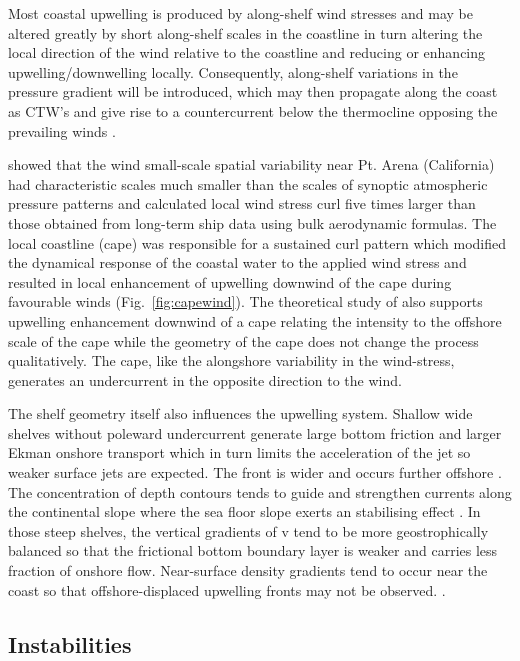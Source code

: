 Most coastal upwelling is produced by along-shelf wind stresses
and may be altered greatly by short along-shelf scales in the
coastline \citep{Crepon82,Crepon84,Haynes93,Wang97} in turn
altering the local direction of the wind relative to the coastline
and reducing or enhancing upwelling/downwelling locally.
Consequently, along-shelf variations in the pressure gradient will
be introduced, which may then propagate along the coast as CTW's
\citep{Crepon82} and give rise to a countercurrent below the
thermocline opposing the prevailing winds \citep{Suginohara82}.

\citet{Enriquez95} showed that the wind small-scale spatial
variability near Pt. Arena (California) had characteristic scales
much smaller than the scales of synoptic atmospheric pressure
patterns and calculated local wind stress curl five times larger
than those obtained from long-term ship data using bulk
aerodynamic formulas. The local coastline (cape) was responsible
for a sustained curl pattern which modified the dynamical response
of the coastal water to the applied wind stress and resulted in
local enhancement of upwelling downwind of the cape during
favourable winds (Fig.~\ref{fig:capewind}). The theoretical study
of \citet{Crepon84} also supports upwelling enhancement downwind
of a cape relating the intensity to the offshore scale of the cape
while the geometry of the cape does not change the process
qualitatively. The cape, like the alongshore variability in the
wind-stress, generates an undercurrent in the opposite direction
to the wind.

The shelf geometry itself also influences the upwelling system.
Shallow wide shelves without poleward undercurrent generate large
bottom friction and larger Ekman onshore transport which in turn
limits the acceleration of the jet so weaker surface jets are
expected. The front is wider and occurs further offshore
\citep{Allen95}. The concentration of depth contours tends to
guide and strengthen currents along the continental slope where
the sea floor slope exerts an stabilising effect
\citep{Huthnance81}. In those steep shelves, the vertical
gradients of v tend to be more geostrophically balanced so that
the frictional bottom boundary layer is weaker and carries less
fraction of onshore flow. Near-surface density gradients tend to
occur near the coast so that offshore-displaced upwelling fronts
may not be observed. \citep{Allen95}.

\subsection{Instabilities}


